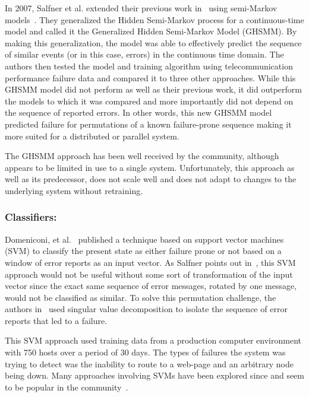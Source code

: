 In 2007, Salfner et al. extended their previous work in~\cite{salfner2006}
using semi-Markov models~\cite{salfner2007}.  They generalized the Hidden
Semi-Markov process for a continuous-time model and called it the Generalized
Hidden Semi-Markov Model (GHSMM).  By making this generalization, the model
was able to effectively predict the sequence of similar events (or in this
case, errors) in the continuous time domain.  The authors then tested the model
and training algorithm using telecommunication performance failure data and
compared it to three other approaches.  While this GHSMM model did not perform
as well as their previous work, it did outperform the models to which it was
compared and more importantly did not depend on the sequence of reported
errors.  In other words, this new GHSMM model predicted failure for
permutations of a known failure-prone sequence making it more suited for a
distributed or parallel system.

The GHSMM approach has been well received by the community, although appears to
be limited in use to a single system.  Unfortunately, this approach as well as
its predecessor, does not scale well and does not adapt to changes to the
underlying system without retraining.

\subsubsection{Classifiers:}
Domeniconi, et al.~\cite{domeniconi2002} published a technique based on
support vector machines (SVM) to classify the present state as either failure
prone or not based on a window of error reports as an input vector.  As Salfner
points out in~\cite{salfnerSurvey}, this SVM approach would not be useful
without some sort of transformation of the input vector since the exact same
sequence of error messages, rotated by one message, would not be classified as
similar.  To solve this permutation challenge, the authors
in~\cite{domeniconi2002} used singular value decomposition to isolate the
sequence of error reports that led to a failure.

This SVM approach used training data from a production computer environment
with 750 hosts over a period of 30 days.  The types of failures the system was
trying to detect was the inability to route to a web-page and an arbitrary node
being down.  Many approaches involving SVMs have been explored since and seem
to be popular in the community~\cite{fronza2013, fulp2008, murray2005,
domeniconi2002, irrera2015}.

